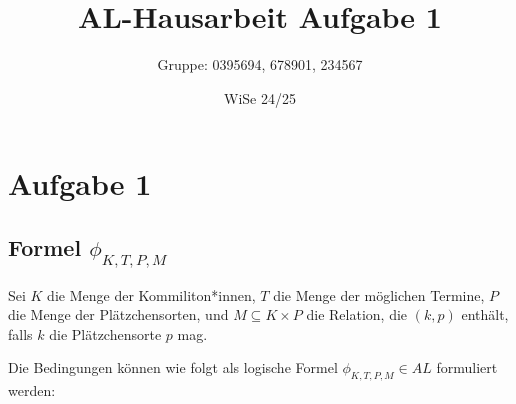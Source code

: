 \documentclass[12pt,a4paper]{article}
\title{AL-Hausarbeit Aufgabe 1}
\author{Gruppe: 0395694, 678901, 234567}
\date{WiSe 24/25}
\begin{document}
\maketitle
\section*{Aufgabe 1}
\subsection*{Formel $\phi_{K,T,P,M}$}

Sei $K$ die Menge der Kommiliton*innen, $T$ die Menge der möglichen Termine, $P$ die Menge der Plätzchensorten, 
und $M \subseteq K \times P$ die Relation, die $(k, p)$ enthält, falls $k$ die Plätzchensorte $p$ mag.

Die Bedingungen können wie folgt als logische Formel $\phi_{K,T,P,M} \in AL$ formuliert werden:
\end{document}

